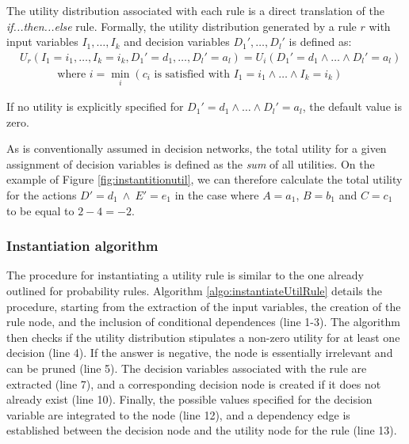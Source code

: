 The utility distribution associated with each rule is a direct translation of the  \textit{if...then...else} rule.  Formally, the utility distribution generated by a rule $r$ with input variables $I_1, \dots, I_k$ and decision variables $D_1', \dots, D_l'$ is defined as:
\begin{align}
& U_r(I_1\!=\!i_1, \dots, I_k\!=\!i_k, D_1'\!=\!d_1, \dots, D_l'\!=\!a_l) = U_i(D_1'\!=\!d_1 \land \dots \land D_l'\!=\!a_l) \label{eq:utildistrib}\\
&  \; \; \; \; \; \; \; \;  \; \; \; \text{ where } i = \min_i (c_i \text{ is satisfied with } I_1\!=\!i_1 \land \dots \land I_k\!=\!i_k) \nonumber
\end{align}

If no utility is explicitly specified for $D_1'\!=\!d_1 \land \dots \land D_l'\!=\!a_l$, the default value is zero. 

As is conventionally assumed in decision networks, the total utility for a given assignment of decision variables is defined as the \textit{sum} of all utilities.  On the example of Figure \ref{fig:instantitionutil}, we can therefore calculate the total utility for the actions $D'\!=\!d_1 \ \land \ E'\!=\!e_1$ in the case where $A\!=\!a_1$, $B\!=\!b_1$ and $C\!=\!c_1$ to be equal to $2 - 4 = -2$. 


\subsubsection*{Instantiation algorithm} 

The procedure for instantiating a utility rule is similar to the one already outlined for probability rules. Algorithm \ref{algo:instantiateUtilRule} details the procedure, starting from the extraction of the input variables, the creation of the rule node, and the inclusion of conditional dependences (line 1-3). The algorithm then checks if the utility distribution stipulates a non-zero utility for at least one decision (line 4).  If the answer is negative, the node is essentially irrelevant and can be pruned (line 5).  The decision variables associated with the rule are extracted (line 7), and a corresponding decision node is created if it does not already exist (line 10). Finally, the possible values specified for the decision variable are integrated to the node (line 12), and a dependency edge is established between the decision node and the utility node for the rule (line 13). 


